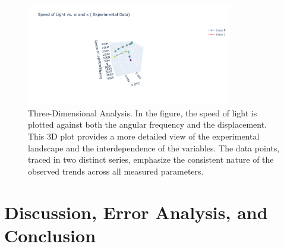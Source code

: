 \documentclass[12pt]{article}
\begin{document}
        \begin{figure}[!h]
                \centering
                \includegraphics[width=0.80\textwidth]{../Imgs/plot5.png}
                \caption{Three-Dimensional Analysis. In the figure, the speed of light is plotted against both the angular
                frequency and the displacement. This 3D plot provides a more detailed view of the experimental landscape and
                the interdependence of the variables. The data points, traced in two distinct series, emphasize the consistent
                nature of the observed trends across all measured parameters.}
                \label{fig: Three-Dimensional Analysis}
        \end{figure}

        
\section{Discussion, Error Analysis, and Conclusion}
\end{document}
